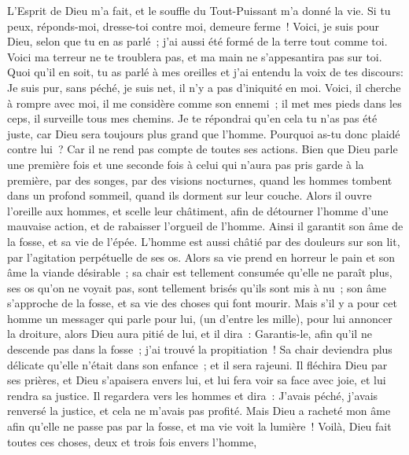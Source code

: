 \begin{multicols}{2}
L'Esprit de Dieu m'a fait, et le souffle du Tout-Puissant m'a donné la vie.
Si tu peux, réponds-moi, dresse-toi contre moi, demeure ferme~!
Voici, je suis pour Dieu, selon que tu en as parlé~; j'ai aussi été formé de la terre tout comme toi.
Voici ma terreur ne te troublera pas, et ma main ne s'appesantira pas sur toi.
Quoi qu'il en soit, tu as parlé à mes oreilles et j'ai entendu la voix de tes discours:
Je suis pur, sans péché, je suis net, il n'y a pas d'iniquité en moi.
Voici, il cherche à rompre avec moi, il me considère comme son ennemi~;
il met mes pieds dans les ceps, il surveille tous mes chemins.
Je te répondrai qu'en cela tu n'as pas été juste, car Dieu sera toujours plus grand que l'homme.
Pourquoi as-tu donc plaidé contre lui~? Car il ne rend pas compte de toutes ses actions.
Bien que Dieu parle une première fois et une seconde fois à celui qui n'aura pas pris garde à la première,
par des songes, par des visions nocturnes, quand les hommes tombent dans un profond sommeil, quand ils dorment sur leur couche.
Alors il ouvre l'oreille aux hommes, et scelle leur châtiment,
afin de détourner l'homme d'une mauvaise action, et de rabaisser l'orgueil de l'homme.
Ainsi il garantit son âme de la fosse, et sa vie de l'épée.
L'homme est aussi châtié par des douleurs sur son lit, par l'agitation perpétuelle de ses os.
Alors sa vie prend en horreur le pain et son âme la viande désirable~;
sa chair est tellement consumée qu'elle ne paraît plus, ses os qu'on ne voyait pas, sont tellement brisés qu'ils sont mis à nu~;
son âme s'approche de la fosse, et sa vie des choses qui font mourir.
Mais s'il y a pour cet homme un messager qui parle pour lui, (un d'entre les mille), pour lui annoncer la droiture,
alors Dieu aura pitié de lui, et il dira~: Garantis-le, afin qu'il ne descende pas dans la fosse~; j'ai trouvé la propitiation~!
Sa chair deviendra plus délicate qu'elle n'était dans son enfance~; et il sera rajeuni.
Il fléchira Dieu par ses prières, et Dieu s'apaisera envers lui, et lui fera voir sa face avec joie, et lui rendra sa justice.
Il regardera vers les hommes et dira~: J'avais péché, j'avais renversé la justice, et cela ne m'avais pas profité.
Mais Dieu a racheté mon âme afin qu'elle ne passe pas par la fosse, et ma vie voit la lumière~!
Voilà, Dieu fait toutes ces choses, deux et trois fois envers l'homme,

\end{multicols}
